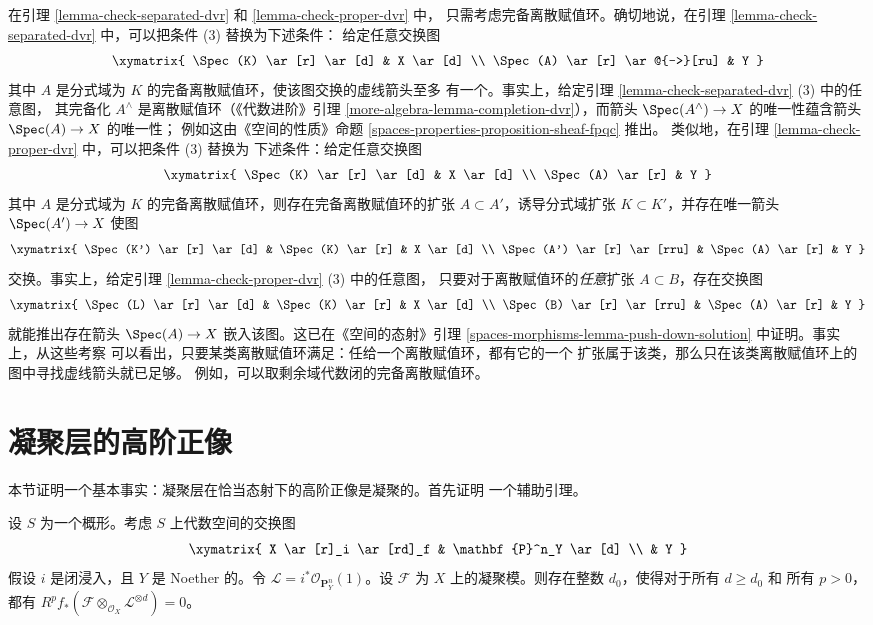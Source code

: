 \begin{remark}[完备离散赋值环的变体]
\label{remark-variant}
在引理 \ref{lemma-check-separated-dvr} 和 \ref{lemma-check-proper-dvr} 中，
只需考虑完备离散赋值环。确切地说，在引理
\ref{lemma-check-separated-dvr} 中，可以把条件 (3) 替换为下述条件：
给定任意交换图
$$
\xymatrix{
\Spec(K) \ar[r] \ar[d] & X \ar[d] \\
\Spec(A) \ar[r] \ar@{-->}[ru] & Y
}
$$
其中 $A$ 是分式域为 $K$ 的完备离散赋值环，使该图交换的虚线箭头至多
有一个。事实上，给定引理 \ref{lemma-check-separated-dvr} (3) 中的任意图，
其完备化 $A^\wedge$ 是离散赋值环（《代数进阶》引理
\ref{more-algebra-lemma-completion-dvr}），而箭头
$\Spec(A^\wedge) \to X$ 的唯一性蕴含箭头 $\Spec(A) \to X$ 的唯一性；
例如这由《空间的性质》命题
\ref{spaces-properties-proposition-sheaf-fpqc} 推出。
类似地，在引理 \ref{lemma-check-proper-dvr} 中，可以把条件 (3) 替换为
下述条件：给定任意交换图
$$
\xymatrix{
\Spec(K) \ar[r] \ar[d] & X \ar[d] \\
\Spec(A) \ar[r] & Y
}
$$
其中 $A$ 是分式域为 $K$ 的完备离散赋值环，则存在完备离散赋值环的扩张
$A \subset A'$，诱导分式域扩张 $K \subset K'$，并存在唯一箭头
$\Spec(A') \to X$ 使图
$$
\xymatrix{
\Spec(K') \ar[r] \ar[d] & \Spec(K) \ar[r] & X \ar[d] \\
\Spec(A') \ar[r] \ar[rru] & \Spec(A) \ar[r] & Y
}
$$
交换。事实上，给定引理 \ref{lemma-check-proper-dvr} (3) 中的任意图，
只要对于离散赋值环的{\it 任意}扩张 $A \subset B$，存在交换图
$$
\xymatrix{
\Spec(L) \ar[r] \ar[d] & \Spec(K) \ar[r] & X \ar[d] \\
\Spec(B) \ar[r] \ar[rru] & \Spec(A) \ar[r] & Y
}
$$
就能推出存在箭头 $\Spec(A) \to X$ 嵌入该图。这已在《空间的态射》引理
\ref{spaces-morphisms-lemma-push-down-solution} 中证明。事实上，从这些考察
可以看出，只要某类离散赋值环满足：任给一个离散赋值环，都有它的一个
扩张属于该类，那么只在该类离散赋值环上的图中寻找虚线箭头就已足够。
例如，可以取剩余域代数闭的完备离散赋值环。
\end{remark}







\section{凝聚层的高阶正像}
\label{section-proper-pushforward}

\noindent
本节证明一个基本事实：凝聚层在恰当态射下的高阶正像是凝聚的。首先证明
一个辅助引理。

\begin{lemma}
\label{lemma-kill-by-twisting}
设 $S$ 为一个概形。考虑 $S$ 上代数空间的交换图
$$
\xymatrix{
X \ar[r]_i \ar[rd]_f & \mathbf{P}^n_Y \ar[d] \\
& Y
}
$$
假设 $i$ 是闭浸入，且 $Y$ 是 Noether 的。令
$\mathcal{L} = i^*\mathcal{O}_{\mathbf{P}^n_Y}(1)$。设 $\mathcal{F}$ 为
$X$ 上的凝聚模。则存在整数 $d_0$，使得对于所有 $d \geq d_0$ 和
所有 $p > 0$，都有
$R^pf_*(\mathcal{F} \otimes_{\mathcal{O}_X} \mathcal{L}^{\otimes d}) = 0$。
\end{lemma}

